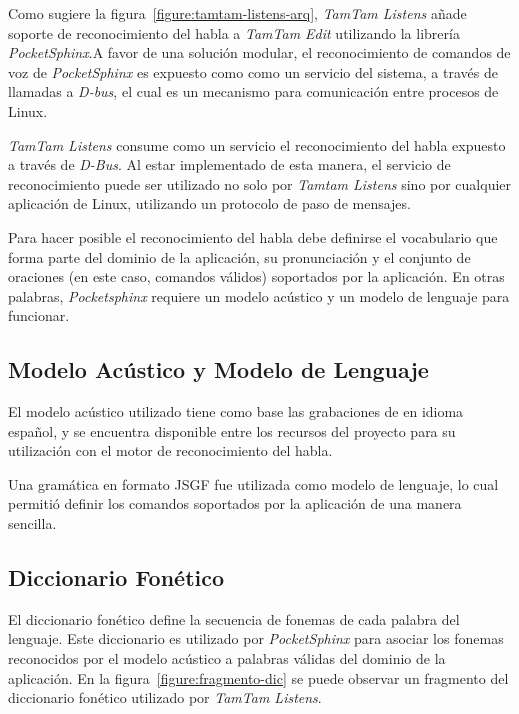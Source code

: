 Como sugiere la figura~\ref{figure:tamtam-listens-arq}, \emph{TamTam Listens} a\~nade soporte de reconocimiento
del habla a \emph{TamTam Edit} utilizando la librer\'ia \emph{PocketSphinx}.A favor de una soluci\'on modular,
el reconocimiento de comandos de voz de \emph{PocketSphinx} es expuesto como 
como un  servicio del sistema, a trav\'es de llamadas a \emph{D-bus}\cite{Dbus2013}, el cual es
un mecanismo para comunicaci\'on entre procesos de Linux.

\emph{TamTam Listens} consume como un servicio el reconocimiento del habla expuesto a trav\'es de \emph{D-Bus}. Al estar implementado de esta manera, el
servicio de reconocimiento puede ser utilizado no solo por \emph{Tamtam Listens} sino por cualquier aplicaci\'on 
de Linux, utilizando un protocolo de paso de mensajes. 

Para hacer posible el reconocimiento del habla debe definirse el vocabulario que forma parte del dominio de 
la aplicaci\'on, su pronunciaci\'on y el conjunto de oraciones (en este caso, comandos v\'alidos) soportados por la aplicaci\'on.
En otras palabras, \emph{Pocketsphinx} requiere un modelo ac\'ustico y un modelo de lenguaje para funcionar.

\subsection{Modelo Ac\'ustico y Modelo de Lenguaje}

El modelo ac\'ustico utilizado tiene como base las grabaciones de  en idioma espa\~nol,
y se encuentra disponible entre los recursos del proyecto  para su utilizaci\'on
con el motor de reconocimiento del habla.

Una gram\'atica en formato JSGF \cite{JSGF2000} fue utilizada como modelo de lenguaje, lo cual permiti\'o
definir los comandos soportados por la aplicaci\'on de una manera sencilla.

\subsection{Diccionario Fon\'etico}

El diccionario fon\'etico define la secuencia de fonemas de cada palabra del lenguaje.
Este diccionario es utilizado por \emph{PocketSphinx} para asociar los fonemas reconocidos por
el modelo ac\'ustico a palabras v\'alidas del dominio de la aplicaci\'on.
En la figura~\ref{figure:fragmento-dic} se puede observar un fragmento del diccionario fon\'etico
utilizado por \emph{TamTam Listens}.

